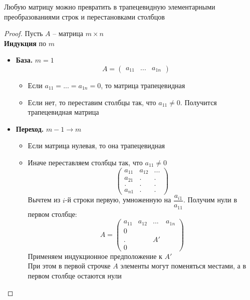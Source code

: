 \begin{theorem}
	Любую матрицу можно превратить в трапецевидную элементарными преобразованиями строк и перестановками столбцов
\end{theorem}

\begin{proof}
	Пусть $ A $ -- матрица $ m \times n $ \\
	\textbf{Индукция} по $ m $
	\begin{itemize}
		\item \textbf{База.} $ m = 1 $
		$$ A =
		\begin{pmatrix}
			a_{11} & ... & a_{1n}
		\end{pmatrix} $$
		\begin{itemize}
			\item Если $ a_{11} = ... = a_{1n} = 0 $, то матрица трапецевидная
			\item Если нет, то переставим столбцы так, что $ a_{11} \ne 0 $. Получится трапецевидная матрица
		\end{itemize}
		\item \textbf{Переход.} $ m - 1 \to m $
		\begin{itemize}
			\item Если матрица нулевая, то она трапецевидная
			\item Иначе переставляем столбцы так, что $ a_{11} \ne 0 $
			$$
			\begin{pmatrix}
				a_{11} & a_{12} & ... \\
				a_{21} & . & . \\
				. & . & . \\
				a_{n1} & . & .
			\end{pmatrix} $$
			Вычтем из $ i $-й строки первую, умноженную на $ \dfrac{a_{i1}}{a_{11}} $. Получим нули в первом столбце:
			$$ A =
			\begin{pmatrix}
				a_{11} & a_{12} & ... & a_{1n} \\
				0 & & & \\
				. & & A' & \\
				0 & & &
			\end{pmatrix} $$
			Применяем индукционное предположение к $ A' $ \\
			При этом в первой строчке $ A $ элементы могут поменяться местами, а в первом столбце остаются нули
		\end{itemize}
	\end{itemize}
\end{proof}

